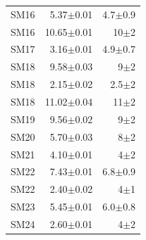 \documentclass[9pt,lineno,final]{elife}
\begin{document}
\begin{table}[H]
\begin{tabular}{lrr}
		SM16           & 5.37$\pm$0.01            & 4.7$\pm$0.9                  \\
		SM16           & 10.65$\pm$0.01           &  10$\pm$2                  \\
		SM17           & 3.16$\pm$0.01            & 4.9$\pm$0.7                  \\
		SM18           & 9.58$\pm$0.03            & 9$\pm$2                  \\
		SM18           & 2.15$\pm$0.02            & 2.5$\pm$2                  \\
		SM18           & 11.02$\pm$0.04             & 11$\pm$2                 \\
		SM19           & 9.56$\pm$0.02            & 9$\pm$2                  \\
		SM20           & 5.70$\pm$0.03            & 8$\pm$2                  \\
		SM21           & 4.10$\pm$0.01            & 4$\pm$2                  \\
		SM22           & 7.43$\pm$0.01            & 6.8$\pm$0.9                  \\
		SM22           & 2.40$\pm$0.02            & 4$\pm$1                  \\
		SM23           & 5.45$\pm$0.01            & 6.0$\pm$0.8                  \\
		SM24           & 2.60$\pm$0.01            & 4$\pm$2                  \\
		\bottomrule
	\end{tabular}
	    
\end{table}
    
\end{document}
